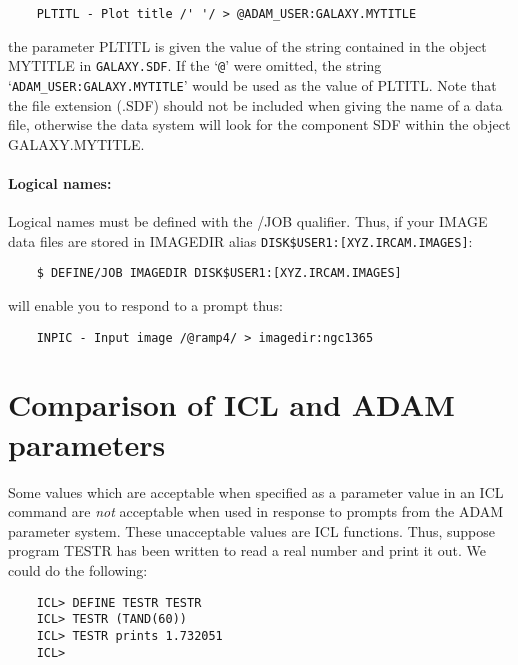 \begin{small}
\begin{verbatim}
    PLTITL - Plot title /' '/ > @ADAM_USER:GALAXY.MYTITLE
\end{verbatim}
\end{small}

the parameter PLTITL is given the value of the string contained in the object
MYTITLE in {\tt GALAXY.SDF}.
If the `{\tt @}' were omitted, the string
`{\tt ADAM\_USER:GALAXY.MYTITLE}' would be used as the value of PLTITL.
Note that the file extension (.SDF) should not be included when giving the
name of a data file, otherwise the data system will look for the component
SDF within the object GALAXY.MYTITLE.

\paragraph{Logical names:}\hfill

Logical names must be defined with the /JOB qualifier.
Thus, if your IMAGE data files are stored in IMAGEDIR alias
{\tt DISK\$USER1:[XYZ.IRCAM.IMAGES]}:

\begin{small}
\begin{verbatim}
    $ DEFINE/JOB IMAGEDIR DISK$USER1:[XYZ.IRCAM.IMAGES]
\end{verbatim}
\end{small}

will enable you to respond to a prompt thus:

\begin{small}
\begin{verbatim}
    INPIC - Input image /@ramp4/ > imagedir:ngc1365
\end{verbatim}
\end{small}


\section{Comparison of ICL and ADAM parameters}
\label{S_comp}

Some values which are acceptable when specified as a parameter value in an
ICL command are {\em not} acceptable when used in response to prompts from
the ADAM parameter system.
These unacceptable values are ICL functions.
Thus, suppose program TESTR has been written to read a real number and print
it out.
We could do the following:

\begin{small}
\begin{verbatim}
    ICL> DEFINE TESTR TESTR
    ICL> TESTR (TAND(60))
    ICL> TESTR prints 1.732051
    ICL>
\end{verbatim}
\end{small}


